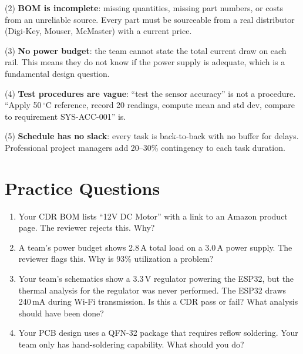 \documentclass[11pt,letterpaper,twoside,openany]{book}
\newcommand{\degC}{\ensuremath{{}^{\circ}\text{C}}}
\begin{document}
(2) \textbf{BOM is incomplete}: missing quantities, missing part numbers, or costs from an unreliable source. Every part must be sourceable from a real distributor (Digi-Key, Mouser, McMaster) with a current price.

(3) \textbf{No power budget}: the team cannot state the total current draw on each rail. This means they do not know if the power supply is adequate, which is a fundamental design question.

(4) \textbf{Test procedures are vague}: ``test the sensor accuracy'' is not a procedure. ``Apply 50\,\degC{} reference, record 20 readings, compute mean and std dev, compare to requirement SYS-ACC-001'' is.

(5) \textbf{Schedule has no slack}: every task is back-to-back with no buffer for delays. Professional project managers add 20--30\% contingency to each task duration.
\section{Practice Questions}
\begin{enumerate}[leftmargin=1.5em]
\item Your CDR BOM lists ``12V DC Motor'' with a link to an Amazon product page. The reviewer rejects this. Why?
\item A team's power budget shows 2.8\,A total load on a 3.0\,A power supply. The reviewer flags this. Why is 93\% utilization a problem?

\item Your team's schematics show a 3.3\,V regulator powering the ESP32, but the thermal analysis for the regulator was never performed. The ESP32 draws 240\,mA during Wi-Fi transmission. Is this a CDR pass or fail? What analysis should have been done?
\item Your PCB design uses a QFN-32 package that requires reflow soldering. Your team only has hand-soldering capability. What should you do?
\end{enumerate}
\end{document}
